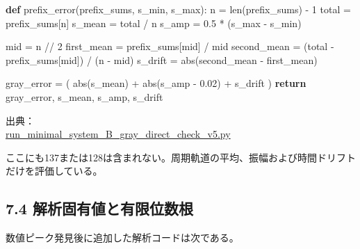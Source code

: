 \documentclass[
  10pt,
  a4paper,
]{article}
\newenvironment{Shaded}{}{}
\newcommand{\BuiltInTok}[1]{\textcolor[rgb]{0.00,0.50,0.00}{#1}}
\newcommand{\ControlFlowTok}[1]{\textcolor[rgb]{0.00,0.44,0.13}{\textbf{#1}}}
\newcommand{\DecValTok}[1]{\textcolor[rgb]{0.25,0.63,0.44}{#1}}
\newcommand{\FloatTok}[1]{\textcolor[rgb]{0.25,0.63,0.44}{#1}}
\newcommand{\KeywordTok}[1]{\textcolor[rgb]{0.00,0.44,0.13}{\textbf{#1}}}
\newcommand{\NormalTok}[1]{#1}
\newcommand{\OperatorTok}[1]{\textcolor[rgb]{0.40,0.40,0.40}{#1}}
\begin{document}
\begin{Shaded}
\begin{Highlighting}[]
\KeywordTok{def}\NormalTok{ prefix\_error(prefix\_sums, s\_min, s\_max):}
\NormalTok{    n }\OperatorTok{=} \BuiltInTok{len}\NormalTok{(prefix\_sums) }\OperatorTok{{-}} \DecValTok{1}
\NormalTok{    total }\OperatorTok{=}\NormalTok{ prefix\_sums[n]}
\NormalTok{    s\_mean }\OperatorTok{=}\NormalTok{ total }\OperatorTok{/}\NormalTok{ n}
\NormalTok{    s\_amp }\OperatorTok{=} \FloatTok{0.5} \OperatorTok{*}\NormalTok{ (s\_max }\OperatorTok{{-}}\NormalTok{ s\_min)}

\NormalTok{    mid }\OperatorTok{=}\NormalTok{ n }\OperatorTok{//} \DecValTok{2}
\NormalTok{    first\_mean }\OperatorTok{=}\NormalTok{ prefix\_sums[mid] }\OperatorTok{/}\NormalTok{ mid}
\NormalTok{    second\_mean }\OperatorTok{=}\NormalTok{ (total }\OperatorTok{{-}}\NormalTok{ prefix\_sums[mid]) }\OperatorTok{/}\NormalTok{ (n }\OperatorTok{{-}}\NormalTok{ mid)}
\NormalTok{    s\_drift }\OperatorTok{=} \BuiltInTok{abs}\NormalTok{(second\_mean }\OperatorTok{{-}}\NormalTok{ first\_mean)}

\NormalTok{    gray\_error }\OperatorTok{=}\NormalTok{ (}
        \BuiltInTok{abs}\NormalTok{(s\_mean)}
        \OperatorTok{+} \BuiltInTok{abs}\NormalTok{(s\_amp }\OperatorTok{{-}} \FloatTok{0.02}\NormalTok{)}
        \OperatorTok{+}\NormalTok{ s\_drift}
\NormalTok{    )}
    \ControlFlowTok{return}\NormalTok{ gray\_error, s\_mean, s\_amp, s\_drift}
\end{Highlighting}
\end{Shaded}

出典：\\
\href{../20260715/run_minimal_system_B_gray_direct_check_v5.py\#L63-L78}{run\_minimal\_system\_B\_gray\_direct\_check\_v5.py}

ここにも137または128は含まれない。周期軌道の平均、振幅および時間ドリフトだけを評価している。

\subsection{7.4
解析固有値と有限位数根}\label{ux89e3ux6790ux56faux6709ux5024ux3068ux6709ux9650ux4f4dux6570ux6839}

数値ピーク発見後に追加した解析コードは次である。
\end{document}
